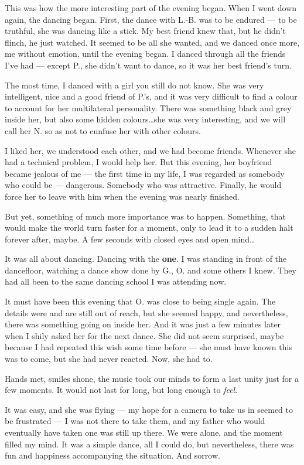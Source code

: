 This was how the more interesting part of the evening began. When I went down again, the dancing began. First, the dance with L.-B. was to be endured --- to be truthful, she was dancing like a stick. My best friend knew that, but he didn't flinch, he just watched. It seemed to be all she wanted, and we danced once more, me without emotion, until the evening began. I danced through all the friends I've had --- except P., she didn't want to dance, so it was her best friend's turn.

The most time, I danced with a girl you still do not know. She was very intelligent, nice and a good friend of P.'s, and it was very difficult to find a colour to account for her multilateral personality. There was something black and grey inside her, but also some hidden colours\ldots she was very interesting, and we will call her N. so as not to cunfuse her with other colours.

I liked her, we understood each other, and we had become friends. Whenever she had a technical problem, I would help her. But this evening, her boyfriend became jealous of me ---  the first time in my life, I was regarded as somebody who could be --- dangerous. Somebody who was attractive. Finally, he would force her to leave with him when the evening was nearly finished.

But yet, something of much more importance was to happen. Something, that would make the world turn faster for a moment, only to lead it to a sudden halt forever after, maybe. A few seconds with closed eyes and open mind\ldots

It was all about dancing. Dancing with the \textbf{one}. I was standing in front of the dancefloor, watching a dance show done by G., O. and some others I knew. They had all been to the same dancing school I was attending now.

It must have been this evening that O. was close to being single again. The details were and are still out of reach, but she seemed happy, and nevertheless, there was something going on inside her. 
And it was just a few minutes later when I shily asked her for the next dance. She did not seem surprised, maybe because I had repeated this wish some time before --- she must have known this was to come, but she had never reacted. Now, she had to.

Hands met, smiles shone, the music took our minds to form a last unity just for a few moments. It would not last for long, but long enough to \emph{feel}.

It was easy, and she was flying --- my hope for a camera to take us in seemed to be frustrated --- I was not there to take them, and my father who would eventually have taken one was still up there. We were alone, and the moment filled my mind. It was a simple dance, all I could do, but nevertheless, there was fun and happiness accompanying the situation. And sorrow.

